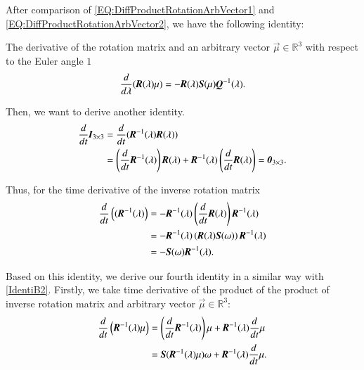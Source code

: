 After comparison of \ref{EQ:DiffProductRotationArbVector1} and \ref{EQ:DiffProductRotationArbVector2}, we have the following identity:
\begin{identity}
The derivative of the rotation matrix and an arbitrary vector $\vec{\mu}\in \mathbb{R}^{3}$ with respect to the Euler angle $1$
\label{IdentiB2}
\begin{align}
\dfrac{d}{d\vec{\lambda}}(\emph{\textbf{R}}(\vec{\lambda})\vec{\mu})=-\emph{\textbf{R}}(\vec{\lambda})\emph{\textbf{S}}(\vec{\mu})\emph{\textbf{Q}}^{-1}(\vec{\lambda}).
\end{align}
\end{identity}
Then, we want to derive another identity.
\begin{align}
\dfrac{d}{dt}\emph{\textbf{I}}_{3\times3}&=
\dfrac{d}{dt}(\emph{\textbf{R}}^{-1}(\vec{\lambda})\emph{\textbf{R}}(\vec{\lambda})) \nonumber \\
&=
\left(\dfrac{d}{dt}\emph{\textbf{R}}^{-1}(\vec{\lambda}) \right)\emph{\textbf{R}}(\vec{\lambda})+\emph{\textbf{R}}^{-1}(\vec{\lambda})\left(\dfrac{d}{dt}\emph{\textbf{R}}(\vec{\lambda})\right)=\emph{\textbf{0}}_{3\times 3}.
\end{align}
\begin{identity}
\label{IdentiB3}
Thus, for the time derivative of the inverse rotation matrix
\begin{align}
\dfrac{d}{dt}\left((\emph{\textbf{R}}^{-1}(\vec{\lambda})\right)&=
-\emph{\textbf{R}}^{-1}(\vec{\lambda})\left(\dfrac{d}{dt}\emph{\textbf{R}}(\vec{\lambda})\right)\emph{\textbf{R}}^{-1}(\vec{\lambda}) \nonumber \\
&=-\emph{\textbf{R}}^{-1}(\vec{\lambda})\left(\emph{\textbf{R}}(\vec{\lambda})\emph{\textbf{S}}(\vec{\omega})\right)\emph{\textbf{R}}^{-1}(\vec{\lambda}) \nonumber \\
&=-\emph{\textbf{S}}(\vec{\omega})\emph{\textbf{R}}^{-1}(\vec{\lambda}).
\end{align}
\end{identity}
Based on this identity, we derive our fourth identity in a similar way with \ref{IdentiB2}. Firstly, we take time derivative of the product of the product of inverse rotation matrix and arbitrary vector $\vec{\mu} \in \mathbb{R}^{3}$:
\begin{align}
\dfrac{d}{dt}\left(\emph{\textbf{R}}^{-1}(\vec{\lambda})\vec{\mu}\right)
&=\left(\dfrac{d}{dt}\emph{\textbf{R}}^{-1}(\vec{\lambda})\right)\vec{\mu}+\emph{\textbf{R}}^{-1}(\vec{\lambda})\dfrac{d}{dt}\vec{\mu} \nonumber \\
&=\emph{\textbf{S}}(\emph{\textbf{R}}^{-1}(\vec{\lambda})\vec{\mu})\vec{\omega}+\emph{\textbf{R}}^{-1}(\vec{\lambda})\dfrac{d}{dt}\vec{\mu}.\label{EQ:DiffProductInvRotationArbVector1}
\end{align} 
